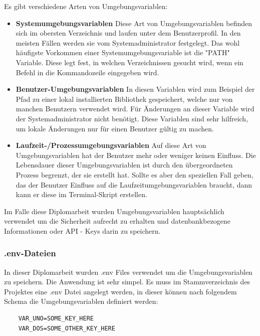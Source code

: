 Es gibt verschiedene Arten von Umgebungsvariablen:

\begin{itemize}
    \item \textbf{Systemumgebungsvariablen}
        \newline
        Diese Art von Umgebungsvariablen befinden sich im obersten Verzeichnis und laufen unter dem Benutzerprofil. In den meisten Fällen werden sie vom Systemadministrator festgelegt. Das wohl häufigste Vorkommen einer Systemumgebungsvariable ist die "PATH" Variable. Diese legt fest, in welchen Verzeichnissen gesucht wird, wenn ein Befehl in die Kommandozeile eingegeben wird.
        \cite{path_setzen}
        
    \item \textbf{Benutzer-Umgebungsvariablen}
        \newline
        In diesen Variablen wird zum Beispiel der Pfad zu einer lokal installierten Bibliothek gespeichert, welche nur von manchen Benutzern verwendet wird. Für Änderungen an dieser Variable wird der Systemadministrator nicht benötigt. Diese Variablen sind sehr hilfreich, um lokale Änderungen nur für einen Benutzer gültig zu machen.
    \item \textbf{Laufzeit-/Prozessumgebungsvariablen}
        \newline
        Auf diese Art von Umgebungsvariablen hat der Benutzer mehr oder weniger keinen Einfluss. Die Lebensdauer dieser Umgebungsvariablen ist durch den übergeordneten Prozess begrenzt, der sie erstellt hat.
        Sollte es aber den speziellen Fall geben, das der Benutzer Einfluss auf die Laufzeitumgebungsvariablen braucht, dann kann er diese im Terminal-Skript erstellen.
\end{itemize}

Im Falle diese Diplomarbeit wurden Umgebungsvariablen hauptsächlich verwendet um die Sicherheit aufrecht zu erhalten und datenbankbezogene Informationen oder API - Keys darin zu speichern.

\subsubsection{.env-Dateien}
In dieser Diplomarbeit wurden .env Files verwendet um die Umgebungsvariablen zu speichern. Die Anwendung ist sehr simpel. Es muss im Stammverzeichnis des Projektes eine .env Datei angelegt werden, in dieser können nach folgendem Schema die Umgebungsvariablen definiert werden:
\begin{verbatim}
    VAR_UNO=SOME_KEY_HERE
    VAR_DOS=SOME_OTHER_KEY_HERE
\end{verbatim}

